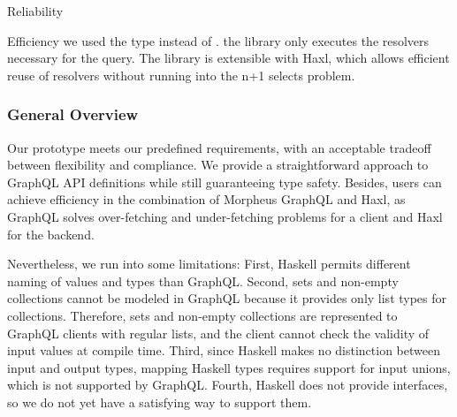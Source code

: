 \begin{frame}[allowframebreaks]
\begin{block}{Reliability}
\begin{itemize}
\end{itemize}

\end{block}

\begin{block}{Efficiency} we used the type  instead of . the library only executes the resolvers necessary for the query. The library is extensible with Haxl, which allows efficient reuse of resolvers without running into the n+1 selects problem.

\end{block}

\end{frame}

\begin{frame}\frametitle{General Overview}

Our prototype meets our predefined requirements, with an acceptable tradeoff between flexibility and compliance. We provide a straightforward approach to GraphQL API definitions while still guaranteeing type safety. Besides, users can achieve efficiency in the combination of Morpheus GraphQL and Haxl, as GraphQL solves over-fetching and under-fetching problems for a client and  Haxl for the backend.

Nevertheless, we run into some limitations: First, Haskell permits different naming of values and types than GraphQL. Second, sets and non-empty collections cannot be modeled in GraphQL because it provides only list types for collections. Therefore, sets and non-empty collections are represented to GraphQL clients with regular lists, and the client cannot check the validity of input values at compile time. Third, since Haskell makes no distinction between input and output types, mapping Haskell types requires support for input unions, which is not supported by GraphQL. Fourth, Haskell does not provide interfaces, so we do not yet have a satisfying way to support them. 
\end{frame}
